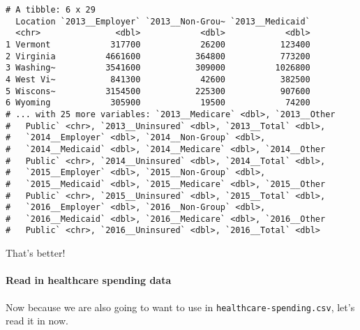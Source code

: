 \documentclass[]{article}
\newenvironment{Shaded}{\begin{snugshade}}{\end{snugshade}}
\newcommand{\DataTypeTok}[1]{\textcolor[rgb]{0.13,0.29,0.53}{#1}}
\newcommand{\DecValTok}[1]{\textcolor[rgb]{0.00,0.00,0.81}{#1}}
\newcommand{\KeywordTok}[1]{\textcolor[rgb]{0.13,0.29,0.53}{\textbf{#1}}}
\newcommand{\NormalTok}[1]{#1}
\newcommand{\OperatorTok}[1]{\textcolor[rgb]{0.81,0.36,0.00}{\textbf{#1}}}
\newcommand{\OtherTok}[1]{\textcolor[rgb]{0.56,0.35,0.01}{#1}}
\newcommand{\StringTok}[1]{\textcolor[rgb]{0.31,0.60,0.02}{#1}}
\let\oldparagraph\paragraph
\renewcommand{\paragraph}[1]{\oldparagraph{#1}\mbox{}}
\begin{document}
\begin{verbatim}
# A tibble: 6 x 29
  Location `2013__Employer` `2013__Non-Grou~ `2013__Medicaid`
  <chr>               <dbl>            <dbl>            <dbl>
1 Vermont            317700            26200           123400
2 Virginia          4661600           364800           773200
3 Washing~          3541600           309000          1026800
4 West Vi~           841300            42600           382500
5 Wiscons~          3154500           225300           907600
6 Wyoming            305900            19500            74200
# ... with 25 more variables: `2013__Medicare` <dbl>, `2013__Other
#   Public` <chr>, `2013__Uninsured` <dbl>, `2013__Total` <dbl>,
#   `2014__Employer` <dbl>, `2014__Non-Group` <dbl>,
#   `2014__Medicaid` <dbl>, `2014__Medicare` <dbl>, `2014__Other
#   Public` <chr>, `2014__Uninsured` <dbl>, `2014__Total` <dbl>,
#   `2015__Employer` <dbl>, `2015__Non-Group` <dbl>,
#   `2015__Medicaid` <dbl>, `2015__Medicare` <dbl>, `2015__Other
#   Public` <chr>, `2015__Uninsured` <dbl>, `2015__Total` <dbl>,
#   `2016__Employer` <dbl>, `2016__Non-Group` <dbl>,
#   `2016__Medicaid` <dbl>, `2016__Medicare` <dbl>, `2016__Other
#   Public` <chr>, `2016__Uninsured` <dbl>, `2016__Total` <dbl>
\end{verbatim}

That's better!

\hypertarget{read-in-healthcare-spending-data}{%
\paragraph{Read in healthcare spending
data}\label{read-in-healthcare-spending-data}}

Now because we are also going to want to use in
\texttt{healthcare-spending.csv}, let's read it in now.

\begin{Shaded}
\end{Shaded}
\end{document}
